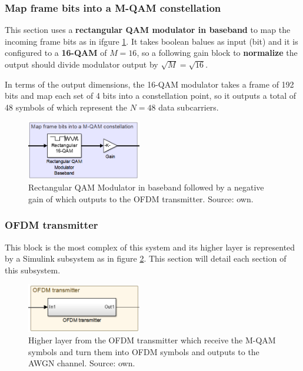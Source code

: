 \subsubsection{Map frame bits into a M-QAM constellation}

This section uses a \textbf{rectangular QAM modulator in baseband} to map the incoming frame bits as in ifgure \ref{fig:block2}. It takes boolean balues as input (bit) and it is configured to a \textbf{16-QAM} of $M=16$, so a following gain block to \textbf{normalize} the output should divide modulator output by $\sqrt{M} = \sqrt{16}$. 

In terms of the output dimensions, the 16-QAM modulator takes a frame of 192 bits and map each set of 4 bits into a constellation point, so it outputs a total of 48 symbols of which represent the $N=48$ data subcarriers.

\begin{figure}[h]
\begin{center}
\includegraphics[width=5cm]{images/block2.png}
\caption{Rectangular QAM Modulator in baseband followed by a negative gain of which outputs to the OFDM transmitter. Source: own.}
\label{fig:block2} 
\end{center}
\end{figure}

\subsubsection{OFDM transmitter}

This block is the most complex of this system and its higher layer is represented by a Simulink subsystem as in figure \ref{fig:block3}. This section will detail each section of this subsystem.

\begin{figure}[h]
\begin{center}
\includegraphics[width=5cm]{images/block3.png}
\caption{Higher layer from the OFDM transmitter which receive the M-QAM symbols and turn them into OFDM symbols and outputs to the AWGN channel. Source: own.}
\label{fig:block3} 
\end{center}
\end{figure}

